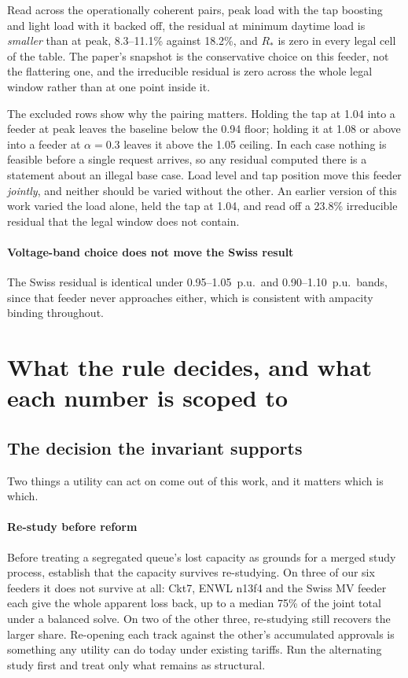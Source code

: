 \documentclass[review,authoryear,12pt]{elsarticle}
\begin{document}
Read across the operationally coherent pairs, peak load with the tap
boosting and light load with it backed off, the residual at minimum daytime
load is \emph{smaller} than at peak, 8.3--11.1\% against 18.2\%, and
$R_{\ast}$ is zero in every legal cell of the table. The paper's snapshot is
the conservative choice on this feeder, not the flattering one, and the
irreducible residual is zero across the whole legal window rather than at one
point inside it.

The excluded rows show why the pairing matters. Holding the tap at 1.04 into a
feeder at peak leaves the baseline below the 0.94 floor; holding it at 1.08 or
above into a feeder at $\alpha=0.3$ leaves it above the 1.05 ceiling. In each
case nothing is feasible before a single request arrives, so any residual
computed there is a statement about an illegal base case. Load level and tap
position move this feeder \emph{jointly}, and neither should be varied without
the other. An earlier version of this work varied the load alone, held the
tap at 1.04, and read off a 23.8\% irreducible residual that the legal window
does not contain.

\paragraph{Voltage-band choice does not move the Swiss result}
The Swiss residual is identical under 0.95--1.05~p.u.\ and 0.90--1.10~p.u.\
bands, since that feeder never approaches either, which is consistent with
ampacity binding throughout.

\section{What the rule decides, and what each number is scoped to}
\label{sec:decides}

\subsection{The decision the invariant supports}
\label{sec:decides-rule}

Two things a utility can act on come out of this work, and it matters which is
which.

\paragraph{Re-study before reform}
Before treating a segregated queue's lost capacity as grounds for a merged
study process, establish that the capacity survives re-studying. On three of
our six feeders it does not survive at all: Ckt7, ENWL n13f4 and the Swiss
MV feeder each give the whole apparent loss back, up to a median 75\% of the
joint total under a balanced solve. On two of the other three,
re-studying still recovers the larger share. Re-opening each track against the
other's accumulated approvals is something any utility can do today under
existing tariffs. Run the alternating study first and treat only what remains
as structural.
\end{document}

